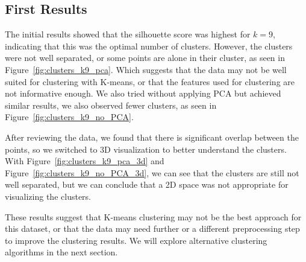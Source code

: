 \subsection{First Results}
\label{subsec:first_results}

The initial results showed that the silhouette score was highest for $k=9$, indicating that this was the optimal number of clusters.
However, the clusters were not well separated, or some points are alone in their cluster, as seen in Figure~\ref{fig:clusters_k9_pca}.
Which suggests that the data may not be well suited for clustering with K-means, or that the features used for clustering are not
informative enough. We also tried without applying PCA but achieved similar results, we also observed fewer clusters, as seen in
Figure~\ref{fig:clusters_k9_no_PCA}.

After reviewing the data, we found that there is significant overlap between the points, so we switched to 3D visualization to better
understand the clusters. With Figure~\ref{fig:clusters_k9_pca_3d} and Figure~\ref{fig:clusters_k9_no_PCA_3d}, we can see that the
clusters are still not well separated, but we can conclude that a 2D space was not appropriate for visualizing the clusters.

These results suggest that K-means clustering may not be the best approach for this dataset, or that the data may need further or a
different preprocessing step to improve the clustering results. We will explore alternative clustering algorithms in the next section.

